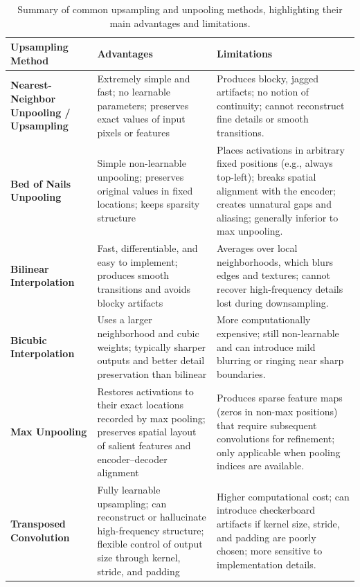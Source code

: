 \begin{table}[H]
	\centering
	\renewcommand{\arraystretch}{1.3}
	\begin{tabular}{|p{3.7cm}|p{4.8cm}|p{4.8cm}|}
		\hline
		\textbf{Upsampling Method} & \textbf{Advantages} & \textbf{Limitations} \\
		\hline
		\textbf{Nearest-Neighbor Unpooling / Upsampling} 
		& Extremely simple and fast; no learnable parameters; preserves exact values of input pixels or features 
		& Produces blocky, jagged artifacts; no notion of continuity; cannot reconstruct fine details or smooth transitions. \\
		\hline
		\textbf{Bed of Nails Unpooling} 
		& Simple non-learnable unpooling; preserves original values in fixed locations; keeps sparsity structure 
		& Places activations in arbitrary fixed positions (e.g., always top-left); breaks spatial alignment with the encoder; creates unnatural gaps and aliasing; generally inferior to max unpooling. \\
		\hline
		\textbf{Bilinear Interpolation} 
		& Fast, differentiable, and easy to implement; produces smooth transitions and avoids blocky artifacts 
		& Averages over local neighborhoods, which blurs edges and textures; cannot recover high-frequency details lost during downsampling. \\
		\hline
		\textbf{Bicubic Interpolation} 
		& Uses a larger neighborhood and cubic weights; typically sharper outputs and better detail preservation than bilinear 
		& More computationally expensive; still non-learnable and can introduce mild blurring or ringing near sharp boundaries. \\
		\hline
		\textbf{Max Unpooling} 
		& Restores activations to their exact locations recorded by max pooling; preserves spatial layout of salient features and encoder--decoder alignment 
		& Produces sparse feature maps (zeros in non-max positions) that require subsequent convolutions for refinement; only applicable when pooling indices are available. \\
		\hline
		\textbf{Transposed Convolution} 
		& Fully learnable upsampling; can reconstruct or hallucinate high-frequency structure; flexible control of output size through kernel, stride, and padding 
		& Higher computational cost; can introduce checkerboard artifacts if kernel size, stride, and padding are poorly chosen; more sensitive to implementation details. \\
		\hline
	\end{tabular}
	\caption{Summary of common upsampling and unpooling methods, highlighting their main advantages and limitations.}
	\label{tab:chapter15_upsampling_comparison}
\end{table}

